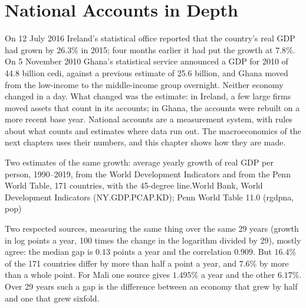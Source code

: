 \chapter{National Accounts in Depth}\label{ch:b1:national-accounts-in-depth}

On 12 July 2016 Ireland's statistical office reported that the country's
real GDP had grown by $26.3\%$ in 2015; four months earlier it had put the
growth at $7.8\%$. %
On 5 November 2010 Ghana's statistical service announced a GDP for 2010 of
44.8 billion cedi, against a previous estimate of 25.6 billion, and Ghana
moved from the low-income to the middle-income group overnight.
Neither economy changed in a day. What changed was the estimate: in
Ireland, a few large firms moved assets that count in its accounts; in
Ghana, the accounts were rebuilt on a more recent base year. National
accounts are a measurement system, with rules about what counts and
estimates where data run out. The macroeconomics of the next chapters
uses their numbers, and this chapter shows how they are made.

\begin{openingchart}{Two estimates of the same growth: average yearly growth
of real GDP per person, 1990--2019, from the World Development Indicators
and from the Penn World Table, 171 countries, with the 45-degree
line.}{World Bank, World Development Indicators (NY.GDP.PCAP.KD); Penn World
Table 11.0 (rgdpna, pop)}
\end{openingchart}

Two respected sources, measuring the same thing over the same 29
years (growth in log points a year, 100 times the change in the logarithm
divided by 29), mostly agree: the median gap is $0.13$ points a year and the
correlation $0.909$. But $16.4\%$ of the 171 countries differ by more than half
a point a year, and $7.6\%$ by more than a whole point. %
For Mali one source gives $1.495\%$ a year and the other $6.17\%$.
Over 29 years such a gap is the difference between an economy that
grew by half and one that grew sixfold.

